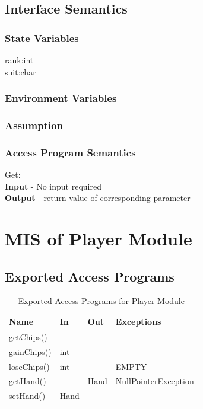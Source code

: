\documentclass[11pt]{article}
\begin{document}
    \subsection{Interface Semantics}
    \subsubsection{State Variables}
    rank:int\\
    suit:char
    \subsubsection{Environment Variables}
    \subsubsection{Assumption}
    \subsubsection{Access Program Semantics}
    Get: \\
    \textbf{Input} - No input required\\
    \textbf{Output} - return value of corresponding parameter\\
 	\newline
 	\section{MIS of Player Module}
     
    \subsection{Exported Access Programs}
    \begin{table}[h]
    \caption{Exported Access Programs for Player Module}
    \begin{tabular}{p{4cm}p{2cm}p{2cm}p{4cm}}
    Name & In & Out & Exceptions\\
    \hline
    getChips() & - & - & -\\
    \hline
    gainChips() & int & - & -\\
	\hline    
    loseChips() & int & - & EMPTY\\
	\hline    	
    getHand() & - & Hand & NullPointerException \\
	\hline    
    setHand()& Hand & - & -\\
    \hline
    \end{tabular}
    \end{table}
\end{document}
